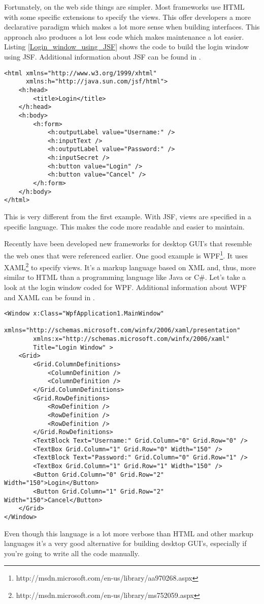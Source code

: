 Fortunately, on the web side things are simpler. Most frameworks use HTML with some specific extensions to specify the views. This offer developers a more declarative paradigm which makes a lot more sense when building interfaces. This approach also produces a lot less code which makes maintenance a lot easier. Listing \ref{Login_window_using_JSF} shows the code to build the login window using JSF. Additional information about JSF can be found in \cite{Mastering_JavaServer_Faces}.
\lstset{language=HTML}
\begin{lstlisting}[caption={Login window using JSF}, label=Login_window_using_JSF]
<html xmlns="http://www.w3.org/1999/xhtml"
      xmlns:h="http://java.sun.com/jsf/html">
    <h:head>
        <title>Login</title>
    </h:head>
    <h:body>
        <h:form>
            <h:outputLabel value="Username:" />
            <h:inputText />
            <h:outputLabel value="Password:" />
            <h:inputSecret />
            <h:button value="Login" />
            <h:button value="Cancel" />
        </h:form>
    </h:body>
</html>
\end{lstlisting}
This is very different from the first example. With JSF, views are specified in a specific language. This makes the code more readable and easier to maintain.

Recently have been developed new frameworks for desktop GUI's that resemble the web ones that were referenced earlier. One good example is WPF\footnote{http://msdn.microsoft.com/en-us/library/aa970268.aspx}. It uses XAML\footnote{http://msdn.microsoft.com/en-us/library/ms752059.aspx} to specify views. It's a markup language based on XML and, thus, more similar to HTML than a programming language like Java or C\#. Let's take a look at the login window coded for WPF. Additional information about WPF and XAML can be found in \cite{WPF_in_Action_with_Visual_Studio_2008}.
\lstset{language=XML}
\begin{lstlisting}[caption={Login window using WPF}]
<Window x:Class="WpfApplication1.MainWindow"
        xmlns="http://schemas.microsoft.com/winfx/2006/xaml/presentation"
        xmlns:x="http://schemas.microsoft.com/winfx/2006/xaml"
        Title="Login Window" >
    <Grid>
        <Grid.ColumnDefinitions>
            <ColumnDefinition />
            <ColumnDefinition />
        </Grid.ColumnDefinitions>
        <Grid.RowDefinitions>
            <RowDefinition />
            <RowDefinition />
            <RowDefinition />
        </Grid.RowDefinitions>
        <TextBlock Text="Username:" Grid.Column="0" Grid.Row="0" />
        <TextBox Grid.Column="1" Grid.Row="0" Width="150" />
        <TextBlock Text="Password:" Grid.Column="0" Grid.Row="1" />
        <TextBox Grid.Column="1" Grid.Row="1" Width="150" />
        <Button Grid.Column="0" Grid.Row="2" Width="150">Login</Button>
        <Button Grid.Column="1" Grid.Row="2" Width="150">Cancel</Button>
    </Grid>
</Window>
\end{lstlisting}
Even though this language is a lot more verbose than HTML and other markup languages it's a very good alternative for building desktop GUI's, especially if you're going to write all the code manually.

